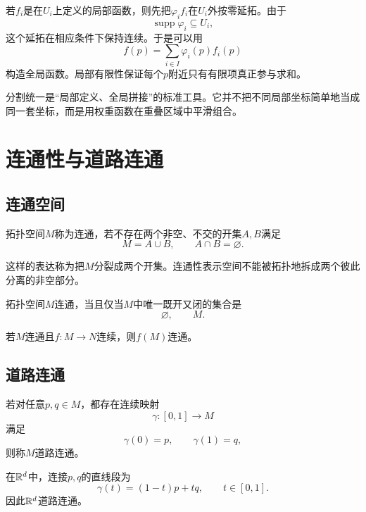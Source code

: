 若$f_i$是在$U_i$上定义的局部函数，则先把$\varphi_i f_i$在$U_i$外按零延拓。由于
\[
    \operatorname{supp}\varphi_i\subseteq U_i,
\]
这个延拓在相应条件下保持连续。于是可以用
\[
    f(p)=\sum_{i\in I}\varphi_i(p)f_i(p)
\]
构造全局函数。局部有限性保证每个$p$附近只有有限项真正参与求和。

\begin{remark}[局部到整体]
分割统一是“局部定义、全局拼接”的标准工具。它并不把不同局部坐标简单地当成同一套坐标，而是用权重函数在重叠区域中平滑组合。
\end{remark}


\section{连通性与道路连通}

\subsection{连通空间}

\begin{definition}[连通]
拓扑空间$M$称为连通，若不存在两个非空、不交的开集$A,B$满足
\[
    M=A\cup B,
    \qquad
    A\cap B=\varnothing.
\]
\end{definition}

这样的表达称为把$M$分裂成两个开集。连通性表示空间不能被拓扑地拆成两个彼此分离的非空部分。

\begin{theorem}[连通与clopen集合]
拓扑空间$M$连通，当且仅当$M$中唯一既开又闭的集合是
\[
    \varnothing,\qquad M.
\]
\end{theorem}

\begin{theorem}[连续像保持连通]
若$M$连通且$f:M\to N$连续，则$f(M)$连通。
\end{theorem}

\subsection{道路连通}

\begin{definition}[道路连通]
若对任意$p,q\in M$，都存在连续映射
\[
    \gamma:[0,1]\to M
\]
满足
\[
    \gamma(0)=p,\qquad \gamma(1)=q,
\]
则称$M$道路连通。
\end{definition}

在$\mathbb{R}^d$中，连接$p,q$的直线段为
\[
    \gamma(t)=(1-t)p+tq,
    \qquad t\in[0,1].
\]
因此$\mathbb{R}^d$道路连通。

